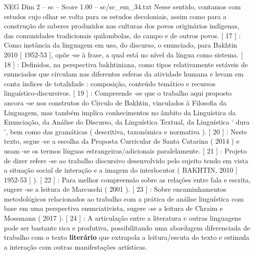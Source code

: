 \begin{textsample}{NEG Dim 2 – sc – Score 1.00 – sc/sc\_em\_34.txt}
Nesse sentido, contamos com estudos cujo olhar se volta para os estudos decoloniais, assim como para a construção de saberes produzidos nas culturas dos povos originários indígenas, das comunidades tradicionais quilombolas, do campo e de outros povos. [ 17 ] : Como instância da linguagem em uso, do discurso, o enunciado, para Bakhtin 2010 [ 1952-53 ], opõe -se à frase, a qual está no nível da língua como sistema. [ 18 ] : Definidos, na perspectiva bakhtiniana, como tipos relativamente estáveis de enunciados que circulam nas diferentes esferas da atividade humana e levam em conta índices de totalidade : composição, conteúdo temático e recursos linguístico-discursivos. [ 19 ] : Compreende -se que o trabalho aqui proposto ancora -se nos construtos do Círculo de Bakhtin, vinculados à Filosofia da Linguagem, mas também implica conhecimentos no âmbito da Linguística da Enunciação, da Análise do Discurso, da Linguística Textual, da Linguística ‘ dura ’, bem como das gramáticas ( descritiva, taxonômica e normativa ). [ 20 ] : Neste texto, segue -se a escolha da Proposta Curricular de Santa Catarina ( 2014 ) e usam -se os termos línguas estrangeiras/adicionais paralelamente. [ 21 ] : Projeto de dizer refere -se ao trabalho discursivo desenvolvido pelo sujeito tendo em vista a situação social de interação e a imagem do interlocutor ( BAKHTIN, 2010 [ 1952-53 ] ). [ 22 ] : Para melhor compreensão sobre as relações entre fala e escrita, sugere -se a leitura de Marcuschi ( 2001 ). [ 23 ] : Sobre encaminhamentos metodológicos relacionados ao trabalho com a prática de análise linguística com base em uma perspectiva enunciativista, sugere -se a leitura de Chraim e Mossmann ( 2017 ). [ 24 ] : A articulação entre a literatura e outras linguagens pode ser bastante rica e produtiva, possibilitando uma abordagem diferenciada de trabalho com o texto \textbf{literário} que extrapola a leitura/escuta do texto e estimula a interação com outras manifestações artísticas.

\end{textsample}
